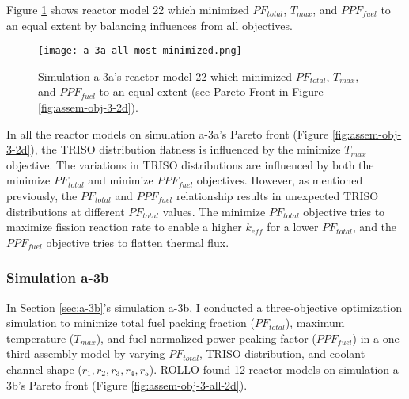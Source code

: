 Figure \ref{fig:a-3a-balanced-reactor-model} shows reactor model 22 which 
minimized $PF_{total}$, $T_{max}$, and $PPF_{fuel}$ to an equal extent by balancing 
influences from all objectives. 
\begin{figure}[htbp!]
    \centering
    \texttt{[image: a-3a-all-most-minimized.png]} 
    \caption{Simulation a-3a's reactor model 22 which minimized $PF_{total}$, $T_{max}$, 
    and $PPF_{fuel}$ to an equal extent (see Pareto Front in 
    Figure \ref{fig:assem-obj-3-2d}).}
\label{fig:a-3a-balanced-reactor-model}
\end{figure}

In all the reactor models on simulation a-3a's Pareto front (Figure 
\ref{fig:assem-obj-3-2d}), the TRISO distribution flatness is influenced by the 
minimize $T_{max}$ objective. 
The variations in \gls{TRISO} distributions are influenced by both the minimize 
$PF_{total}$ and minimize $PPF_{fuel}$ objectives. 
However, as mentioned previously, the $PF_{total}$ and $PPF_{fuel}$ relationship
results in unexpected TRISO distributions at different $PF_{total}$ values. 
The minimize $PF_{total}$ objective tries to maximize fission reaction rate
to enable a higher $k_{eff}$ for a lower $PF_{total}$, and 
the $PPF_{fuel}$ objective tries to flatten thermal flux. 

\subsubsection{Simulation a-3b}
In Section \ref{sec:a-3b}'s simulation a-3b, I conducted a three-objective 
optimization simulation to minimize total fuel packing fraction ($PF_{total}$), 
maximum temperature ($T_{max}$), and fuel-normalized power peaking factor 
($PPF_{fuel}$) in a one-third assembly model by varying $PF_{total}$, 
TRISO distribution, and coolant channel shape ($r_1, r_2, r_3, r_4, r_5$).
\gls{ROLLO} found 12 reactor models on simulation a-3b's Pareto 
front (Figure \ref{fig:assem-obj-3-all-2d}).

